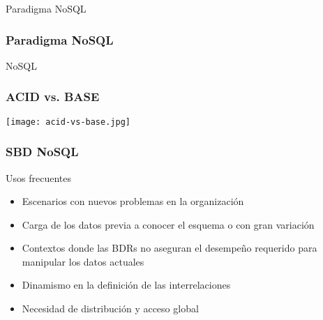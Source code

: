 \begin{frame}
    \centering
    \Huge Paradigma NoSQL

\end{frame}

\begin{frame}
    \frametitle{Paradigma NoSQL}

    \centering
    \Huge NoSQL 

\end{frame}

\begin{frame}
    \frametitle{ACID vs. BASE}

    \centering
    \texttt{[image: acid-vs-base.jpg]}
\end{frame}

\begin{frame}
    \frametitle{SBD NoSQL}

    \begin{block}{Usos frecuentes}
        \pause
        \begin{itemize}[<+->]
            \item Escenarios con nuevos problemas en la organización
            \item Carga de los datos previa a conocer el esquema o con gran variación
            \item Contextos donde las BDRs no aseguran  el desempeño requerido para manipular los datos actuales
            \item Dinamismo en la definición de las interrelaciones
            \item Necesidad de distribución y acceso global
        \end{itemize}
    \end{block}

\end{frame}

